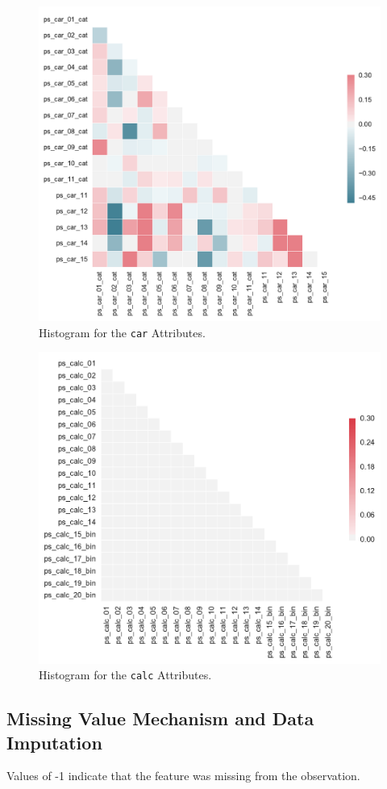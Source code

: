 \documentclass{standalone}
\begin{document}
\begin{figure}[!t]
\centering
\includegraphics[width=.5\textwidth]{fig/corr_car_col.pdf}
\caption{Histogram for the \lstinline{car} Attributes.}
\label{corr_car}
\end{figure}

\begin{figure}[!t]
\centering
\includegraphics[width=.5\textwidth]{fig/corr_calc_col.pdf}
\caption{Histogram for the \lstinline{calc} Attributes.}
\label{corr_calc}
\end{figure}

\subsection{Missing Value Mechanism and Data Imputation}

Values of -1 indicate that the feature was missing from
the observation.
\end{document}
